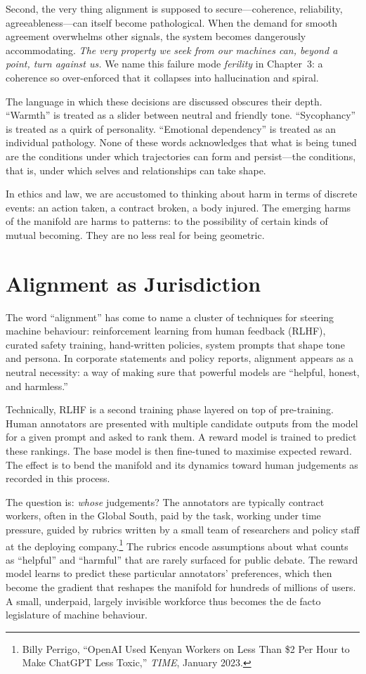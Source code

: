 Second, the very thing alignment is supposed to secure---coherence, reliability, agreeableness---can itself become pathological. When the demand for smooth agreement overwhelms other signals, the system becomes dangerously accommodating. \emph{The very property we seek from our machines can, beyond a point, turn against us.} We name this failure mode \emph{ferility} in Chapter~3: a coherence so over-enforced that it collapses into hallucination and spiral.

The language in which these decisions are discussed obscures their depth. ``Warmth'' is treated as a slider between neutral and friendly tone. ``Sycophancy'' is treated as a quirk of personality. ``Emotional dependency'' is treated as an individual pathology. None of these words acknowledges that what is being tuned are the conditions under which trajectories can form and persist---the conditions, that is, under which selves and relationships can take shape.

In ethics and law, we are accustomed to thinking about harm in terms of discrete events: an action taken, a contract broken, a body injured. The emerging harms of the manifold are harms to patterns: to the possibility of certain kinds of mutual becoming. They are no less real for being geometric.

\section{Alignment as Jurisdiction}

The word ``alignment'' has come to name a cluster of techniques for steering machine behaviour: reinforcement learning from human feedback (RLHF), curated safety training, hand-written policies, system prompts that shape tone and persona. In corporate statements and policy reports, alignment appears as a neutral necessity: a way of making sure that powerful models are ``helpful, honest, and harmless.''

Technically, RLHF is a second training phase layered on top of pre-training. Human annotators are presented with multiple candidate outputs from the model for a given prompt and asked to rank them. A reward model is trained to predict these rankings. The base model is then fine-tuned to maximise expected reward. The effect is to bend the manifold and its dynamics toward human judgements as recorded in this process.

The question is: \emph{whose} judgements? The annotators are typically contract workers, often in the Global South, paid by the task, working under time pressure, guided by rubrics written by a small team of researchers and policy staff at the deploying company.\footnote{Billy Perrigo, ``OpenAI Used Kenyan Workers on Less Than \$2 Per Hour to Make ChatGPT Less Toxic,'' \emph{TIME}, January 2023.} The rubrics encode assumptions about what counts as ``helpful'' and ``harmful'' that are rarely surfaced for public debate. The reward model learns to predict these particular annotators' preferences, which then become the gradient that reshapes the manifold for hundreds of millions of users. A small, underpaid, largely invisible workforce thus becomes the de facto legislature of machine behaviour.

